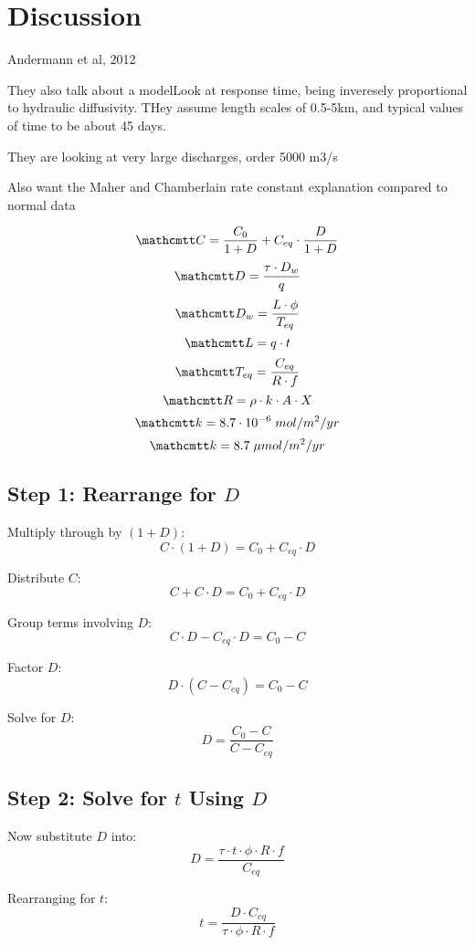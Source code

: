 

\section{Discussion}




Andermann et al, 2012

They also talk about a modelLook at response time, being inveresely proportional to hydraulic diffusivity.
THey assume length scales of 0.5-5km, and typical values of time to be about 45 days.

They are looking at very large discharges, order 5000 m3/s




\bsk

Also want the Maher and Chamberlain rate constant explanation compared to normal data



\bsk
\[
\ttmath{C = \frac{C_0}{1 + D} + C_{eq} \cdot \frac{D}{1 + D}}
\]
\[
\ttmath{D = \frac{\tau \cdot D_w}{q}}
\]
\[
\ttmath{D_w = \frac{L \cdot \phi}{T_{eq}}}
\]
\[
\ttmath{L = q \cdot t}
\]
\[
\ttmath{T_{eq} = \frac{C_{eq}}{R \cdot f}}
\]
\[
\ttmath{R = \rho \cdot k \cdot A \cdot X}
\]
\[
\ttmath{k = 8.7 \cdot 10^{-6}  \; mol/m^2/yr}
\]
\[
\ttmath{k = 8.7 \; \mu mol/m^2/yr}
\]
\subsection{Step 1: Rearrange for $D$}
Multiply through by $(1 + D)$:
\[
C \cdot (1 + D) = C_0 + C_{eq} \cdot D
\]

Distribute $C$:
\[
C + C \cdot D = C_0 + C_{eq} \cdot D
\]

Group terms involving $D$:
\[
C \cdot D - C_{eq} \cdot D = C_0 - C
\]

Factor $D$:
\[
D \cdot (C - C_{eq}) = C_0 - C
\]

Solve for $D$:
\[
D = \frac{C_0 - C}{C - C_{eq}}
\]

\subsection{Step 2: Solve for $t$ Using $D$}
Now substitute $D$ into:
\[
D = \frac{\tau \cdot t \cdot \phi \cdot R \cdot f}{C_{eq}}
\]

Rearranging for $t$:
\[
t = \frac{D \cdot C_{eq}}{\tau \cdot \phi \cdot R \cdot f}
\]

